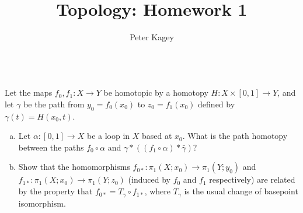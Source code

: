 \documentclass{article}
\newenvironment{problem}[2][Problem]{\begin{trivlist}
\item[\hskip \labelsep {\bfseries #1}\hskip \labelsep {\bfseries #2.}]}{\end{trivlist}}
\begin{document}
\title{Topology: Homework 1}
\author{Peter Kagey}

\maketitle

\begin{problem}{1} \text{} \\
  Let the maps $f_0, f_1\colon X \rightarrow Y$ be homotopic by a homotopy
  $H\colon X \times [0,1] \rightarrow Y$, and let $\gamma$ be the path from
  $y_0 = f_0(x_0)$ to $z_0 = f_1(x_0)$ defined by $\gamma(t) = H(x_0, t)$.
  \begin{enumerate}[(a)]
    \item Let $\alpha\colon[0,1]\rightarrow X$ be a loop in $X$ based at $x_0$.
    What is the path homotopy between the paths $f_0 \circ \alpha$ and
    $\gamma * ((f_1 \circ \alpha) * \bar\gamma)$?
    \item Show that the homomorphisms
    $f_{0*}\colon \pi_1(X; x_0) \rightarrow \pi_1(Y; y_0)$ and
    $f_{1*}\colon \pi_1(X; x_0) \rightarrow \pi_1(Y; z_0)$ (induced by $f_0$ and
    $f_1$ respectively) are related by the property that
    $f_{0*} = T_\gamma \circ f_{1*}$, where $T_\gamma$ is the usual change of
    basepoint isomorphism.
  \end{enumerate}
\end{problem}
\end{document}
